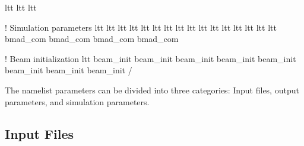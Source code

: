 \documentclass{hitec}
\begin{document}
{{{{{{{{{{{{{{{{{{\begin{code}
  ltt%
  ltt%
  ltt%

  ! Simulation parameters
  ltt%
  ltt%
  ltt%
  ltt%
  ltt%
  ltt%
  ltt%
  ltt%
  ltt%
  ltt%
  ltt%
  ltt%
  ltt%
  ltt%
  ltt%
  ltt%
  bmad_com%
  bmad_com%
  bmad_com%
  bmad_com%

  ! Beam initialization
  ltt%
  beam_init%
  beam_init%
  beam_init%
  beam_init%
  beam_init%
  beam_init%
  beam_init%
  beam_init%
/
\end{code}

\newpage

The namelist parameters can be divided into three categories: Input files, output parameters, and
simulation parameters.

\subsection{Input Files}

}}}}}}}}}}}}}}}}}}
\end{document}
